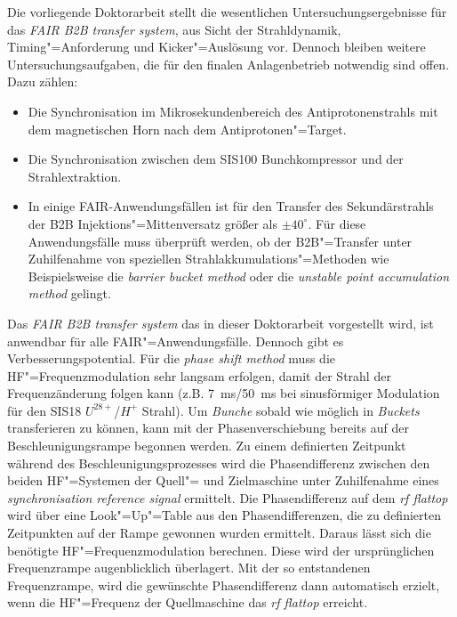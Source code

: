 Die vorliegende Doktorarbeit stellt die wesentlichen Untersuchungsergebnisse f\"ur das \textit{FAIR B2B transfer system}, aus Sicht der Strahldynamik, Timing"=Anforderung und Kicker"=Ausl\"osung vor. Dennoch bleiben weitere Untersuchungsaufgaben, die für den finalen Anlagenbetrieb notwendig sind offen. Dazu z\"ahlen:
\begin{itemize}

\item Die Synchronisation im Mikrosekundenbereich des Antiprotonenstrahls mit dem magnetischen Horn nach dem Antiprotonen"=Target.
\item Die Synchronisation zwischen dem SIS100 Bunchkompressor und der Strahlextraktion.
\item In einige FAIR-Anwendungsf\"allen ist f\"ur den Transfer des Sekund\"arstrahls der B2B Injektions"=Mittenversatz gr\"o\ss{}er als $\pm40^\circ$.  F\"ur diese Anwendungsf\"alle muss \"uberpr\"uft werden, ob der B2B"=Transfer unter Zuhilfenahme von speziellen Strahlakkumulations"=Methoden wie Beispielsweise die \textit{barrier bucket method} oder die \textit{unstable point accumulation method} gelingt.
\end{itemize}

Das \textit{FAIR B2B transfer system} das in dieser Doktorarbeit vorgestellt wird, ist anwendbar f\"ur alle FAIR"=Anwendungsf\"alle. Dennoch gibt es Verbesserungspotential. F\"ur die \textit{phase shift method} muss die HF"=Frequenzmodulation sehr langsam erfolgen, damit der Strahl der Frequenz\"anderung folgen kann (z.B. \SI{7}{\ms}/\SI{50}{\ms} bei sinusf\"ormiger Modulation für den SIS18 $U^\mathit{28+}$/$H^\mathit{+}$ Strahl). Um \textit{Bunche} sobald wie m\"oglich in \textit{Buckets} transferieren zu k\"onnen, kann mit der Phasenverschiebung bereits auf der Beschleunigungsrampe begonnen werden. Zu einem definierten Zeitpunkt w\"ahrend des Beschleunigungsprozesses wird die Phasendifferenz zwischen den beiden HF"=Systemen der Quell"= und Zielmaschine unter Zuhilfenahme eines \textit{synchronisation reference signal} ermittelt. Die Phasendifferenz auf dem \textit{rf flattop} wird \"uber eine Look"=Up"=Table aus den Phasendifferenzen, die zu definierten Zeitpunkten auf der Rampe gewonnen wurden ermittelt. Daraus l\"asst sich die ben\"otigte HF"=Frequenzmodulation berechnen. Diese wird der urspr\"unglichen Frequenzrampe augenblicklich \"uberlagert. Mit der so entstandenen Frequenzrampe, wird die gew\"unschte Phasendifferenz dann automatisch erzielt, wenn die HF"=Frequenz der Quellmaschine das \textit{rf flattop} erreicht.